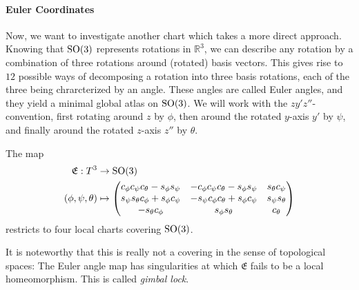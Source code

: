 \paragraph*{Euler Coordinates}
Now, we want to investigate another chart which takes a more direct approach. Knowing that $\operatorname{SO}(3)$ represents rotations in $\mathbb{R}^3$, we can describe any rotation by a combination of three rotations around (rotated) basis vectors. This gives rise to $12$ possible ways of decomposing a rotation into three basis rotations, each of the three being chrarcterized by an angle. These angles are called Euler angles, and they yield a minimal global atlas on $\operatorname{SO}(3)$. We will work with the $zy'z''$-convention, first rotating around $z$ by $\phi$, then around the rotated $y$-axis $y'$ by $\psi$, and finally around the rotated $z$-axis $z''$ by $\theta$. 
\begin{theorem}
    The map
    \begin{align*}
        \mathfrak{E}: T^3 &\to \operatorname{SO}(3)\\
        (\phi, \psi, \theta) &\mapsto \begin{pmatrix} c_\phi c_\psi c_\theta- s_\phi s_\psi & - c_\phi c_\psi c_\theta - s_\phi s_\psi & s_\theta c_\psi \\ s_\psi s_\theta c_\phi + s_\phi c_\psi & -s_\psi c_\phi c_\theta + s_\phi c_\psi & s_\psi s_\theta \\ -s_\theta c_\phi & s_\phi s_\theta & c_\theta \end{pmatrix}
    \end{align*}
    restricts to four local charts covering $\operatorname{SO}(3)$.
\end{theorem}
It is noteworthy that this is really not a covering in the sense of topological spaces: The Euler angle map has singularities at which $\mathfrak{E}$ fails to be a local homeomorphism. This is called \emph{gimbal lock}.
